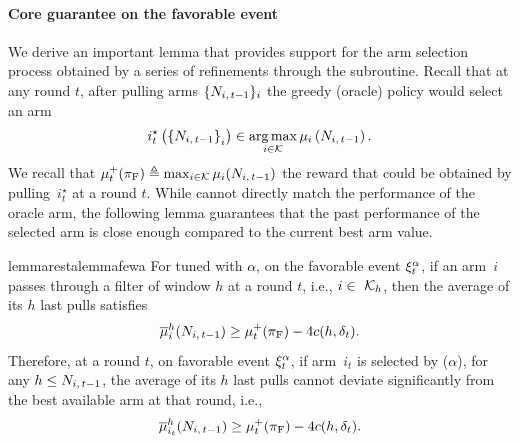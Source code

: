 \paragraph{Core guarantee on the favorable event} 
We derive an important lemma that provides support for the arm selection process obtained by a series of refinements through the \FILTER subroutine. Recall that at any round $t$, after pulling arms $\{ N_{i,\,t-1}\}_i$ the greedy (oracle) policy would select an arm 
%
\begin{align*}
i^\star_t \left(\left\{ N_{i,\,t-1} \right\}_i\right)  \in  \operatorname*{arg\,max}_{i \in \mathcal{K}} \mu_i \left( N_{i,\,t-1}\right).
\end{align*}
%
We recall that $\mu^+_t(\pi_{\rm F}) \triangleq \max_{i \in \mathcal{K}} \mu_i (N_{i,\,t-1})$ the reward that could be obtained by pulling~$i^\star_t$ at a round $t$. 
While \FEWA cannot directly match the performance of the oracle arm, the following lemma guarantees that the past performance of the selected arm is close enough compared to the current best arm value. 

\begin{restatable}{lemma}{restalemmafewa}
\label{lem:core-FEWA}
For {\FEWA} tuned with $\alpha$, on the favorable event $\xi^\alpha_t$, if an arm~$i$ passes through a filter of window $h$ at a round $t$, i.e., $i\in\ \mathcal{K}_h$, then the average of its $h$ last pulls satisfies
%
\begin{equation}\label{eq:fundamental-eq-FEWA}
\overline{\mu}^{h}_i(N_{i,\,t-1} ) \geq  \mu^+_t(\pi_{\rm F}) - 4 c(h, \delta_t).
\end{equation}
Therefore, at a round $t$, on favorable event $\xi^\alpha_t$, if arm~$i_{t}$ is selected by {\FEWA($\alpha$)}, for any $h \leq N_{i,\,t-1}$,  the average of its $h$ last pulls cannot deviate significantly from the best available arm at that round, i.e.,
%
\begin{equation*}
\overline{\mu}^{h}_{i_{t}}(N_{i,\,t-1}) \geq \mu^+_t(\pi_{\rm F}) - 4 c(h, \delta_{t}).
\end{equation*}
\end{restatable}

